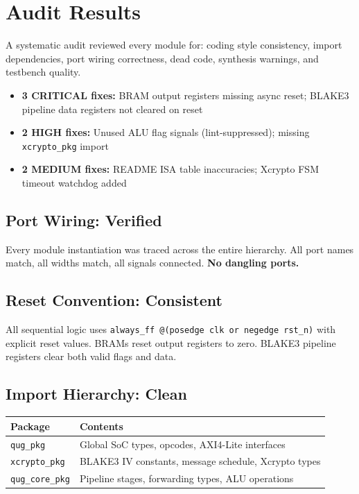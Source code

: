 \documentclass[11pt,a4paper]{article}
\begin{document}
\section{Audit Results}

A systematic audit reviewed every module for: coding style consistency, import dependencies, port wiring correctness, dead code, synthesis warnings, and testbench quality.

\begin{greeninsight}
\begin{itemize}[leftmargin=1.5em, itemsep=2pt]
    \item \textbf{3 CRITICAL fixes:} BRAM output registers missing async reset; BLAKE3 pipeline data registers not cleared on reset
    \item \textbf{2 HIGH fixes:} Unused ALU flag signals (lint-suppressed); missing \texttt{xcrypto\_pkg} import
    \item \textbf{2 MEDIUM fixes:} README ISA table inaccuracies; Xcrypto FSM timeout watchdog added
\end{itemize}
\end{greeninsight}

\subsection{Port Wiring: Verified}

Every module instantiation was traced across the entire hierarchy. All port names match, all widths match, all signals connected. \textbf{No dangling ports.}

\subsection{Reset Convention: Consistent}

All sequential logic uses \texttt{always\_ff @(posedge clk or negedge rst\_n)} with explicit reset values. BRAMs reset output registers to zero. BLAKE3 pipeline registers clear both valid flags and data.

\subsection{Import Hierarchy: Clean}

\begin{center}
\begin{tabular}{@{}ll@{}}
\toprule
\textbf{Package} & \textbf{Contents} \\
\midrule
\texttt{qug\_pkg} & Global SoC types, opcodes, AXI4-Lite interfaces \\
\texttt{xcrypto\_pkg} & BLAKE3 IV constants, message schedule, Xcrypto types \\
\texttt{qug\_core\_pkg} & Pipeline stages, forwarding types, ALU operations \\
\bottomrule
\end{tabular}
\end{center}
\end{document}
